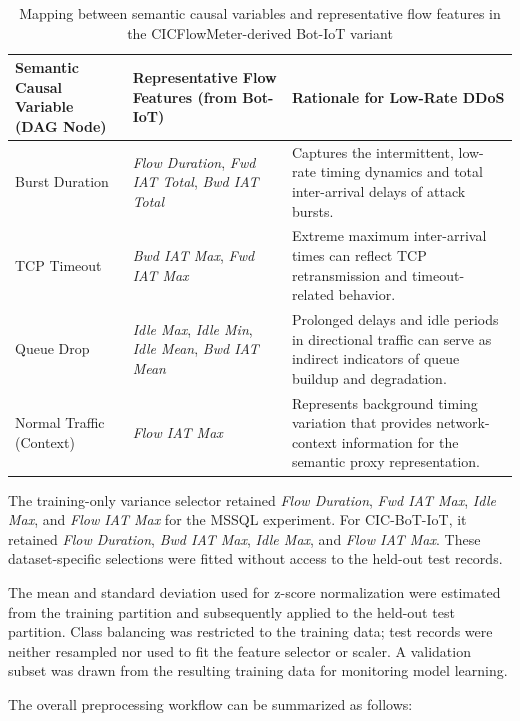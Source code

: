 \documentclass[journal]{IEEEtran}
\begin{document}
\begin{table}[!t]
  \centering
  \caption{Mapping between semantic causal variables and representative flow features in the CICFlowMeter-derived Bot-IoT variant}
  \label{tab:feature_mapping}
  \renewcommand{\arraystretch}{1.15}
  \begin{tabular}{@{}L{0.20\textwidth}L{0.29\textwidth}L{0.45\textwidth}@{}}
    \toprule
    Semantic Causal Variable (DAG Node) & Representative Flow Features (from Bot-IoT) & Rationale for Low-Rate DDoS \\
    \midrule
    Burst Duration & \textit{Flow Duration}, \textit{Fwd IAT Total}, \textit{Bwd IAT Total} & Captures the intermittent, low-rate timing dynamics and total inter-arrival delays of attack bursts. \\
    TCP Timeout & \textit{Bwd IAT Max}, \textit{Fwd IAT Max} & Extreme maximum inter-arrival times can reflect TCP retransmission and timeout-related behavior. \\
    Queue Drop & \textit{Idle Max}, \textit{Idle Min}, \textit{Idle Mean}, \textit{Bwd IAT Mean} & Prolonged delays and idle periods in directional traffic can serve as indirect indicators of queue buildup and degradation. \\
    Normal Traffic (Context) & \textit{Flow IAT Max} & Represents background timing variation that provides network-context information for the semantic proxy representation. \\
    \bottomrule
  \end{tabular}
\end{table}

The training-only variance selector retained \textit{Flow Duration},
\textit{Fwd IAT Max}, \textit{Idle Max}, and \textit{Flow IAT Max} for the
MSSQL experiment. For CIC-BoT-IoT, it retained \textit{Flow Duration},
\textit{Bwd IAT Max}, \textit{Idle Max}, and \textit{Flow IAT Max}. These
dataset-specific selections were fitted without access to the held-out test
records.

The mean and standard deviation used for z-score normalization were estimated
from the training partition and subsequently applied to the held-out test
partition. Class balancing was restricted to the training data; test records
were neither resampled nor used to fit the feature selector or scaler. A
validation subset was drawn from the resulting training data for monitoring
model learning.

The overall preprocessing workflow can be summarized as follows:
\end{document}
